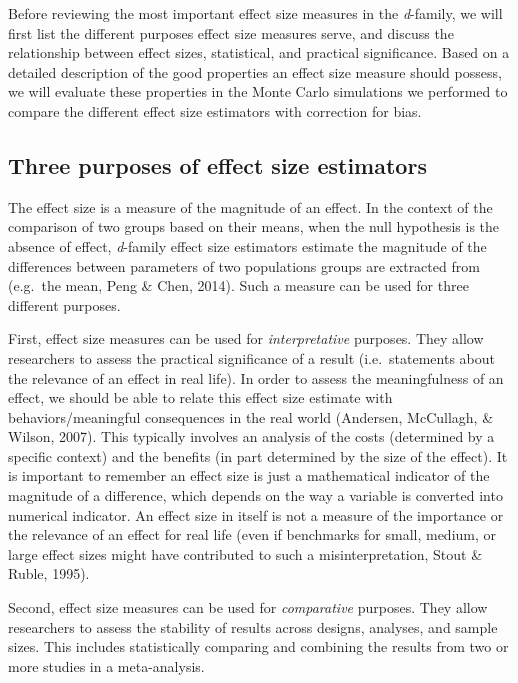 \documentclass[
  12pt,
  french,
]{article}
\begin{document}
Before reviewing the most important effect size measures in the
\emph{d}-family, we will first list the different purposes effect size
measures serve, and discuss the relationship between effect sizes,
statistical, and practical significance. Based on a detailed description
of the good properties an effect size measure should possess, we will
evaluate these properties in the Monte Carlo simulations we performed to
compare the different effect size estimators with correction for bias.

\hypertarget{three-purposes-of-effect-size-estimators}{%
\subsection{Three purposes of effect size
estimators}\label{three-purposes-of-effect-size-estimators}}

The effect size is a measure of the magnitude of an effect. In the
context of the comparison of two groups based on their means, when the
null hypothesis is the absence of effect, \emph{d}-family effect size
estimators estimate the magnitude of the differences between parameters
of two populations groups are extracted from (e.g.~the mean, Peng \&
Chen, 2014). Such a measure can be used for three different purposes.

First, effect size measures can be used for \emph{interpretative}
purposes. They allow researchers to assess the practical significance of
a result (i.e.~statements about the relevance of an effect in real
life). In order to assess the meaningfulness of an effect, we should be
able to relate this effect size estimate with behaviors/meaningful
consequences in the real world (Andersen, McCullagh, \& Wilson, 2007).
This typically involves an analysis of the costs (determined by a
specific context) and the benefits (in part determined by the size of
the effect). It is important to remember an effect size is just a
mathematical indicator of the magnitude of a difference, which depends
on the way a variable is converted into numerical indicator. An effect
size in itself is not a measure of the importance or the relevance of an
effect for real life (even if benchmarks for small, medium, or large
effect sizes might have contributed to such a misinterpretation, Stout
\& Ruble, 1995).

Second, effect size measures can be used for \emph{comparative}
purposes. They allow researchers to assess the stability of results
across designs, analyses, and sample sizes. This includes statistically
comparing and combining the results from two or more studies in a
meta-analysis.
\end{document}
